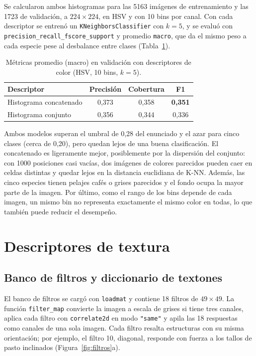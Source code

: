 \documentclass[11pt]{article}
\begin{document}
Se calcularon ambos histogramas para las 5163 imágenes de entrenamiento y las 1723 de validación, a $224\times224$, en HSV y con 10 bins por canal. Con cada descriptor se entrenó un \texttt{KNeighborsClassifier} con $k=5$, y se evaluó con \texttt{precision\_recall\_fscore\_support} y promedio \texttt{macro}, que da el mismo peso a cada especie pese al desbalance entre clases (Tabla~\ref{tab:color}).

\begin{table}[H]
\centering
\caption{Métricas promedio (macro) en validación con descriptores de color (HSV, 10 bins, $k=5$).}
\label{tab:color}
\begin{tabular}{lccc}
\toprule
Descriptor & Precisión & Cobertura & F1 \\
\midrule
Histograma concatenado & 0,373 & 0,358 & \textbf{0,351} \\
Histograma conjunto    & 0,356 & 0,344 & 0,336 \\
\bottomrule
\end{tabular}
\end{table}

Ambos modelos superan el umbral de 0,28 del enunciado y el azar para cinco clases (cerca de 0,20), pero quedan lejos de una buena clasificación. El concatenado es ligeramente mejor, posiblemente por la dispersión del conjunto: con 1000 posiciones casi vacías, dos imágenes de colores parecidos pueden caer en celdas distintas y quedar lejos en la distancia euclidiana de K-NN. Además, las cinco especies tienen pelajes cafés o grises parecidos y el fondo ocupa la mayor parte de la imagen. Por último, como el rango de los bins depende de cada imagen, un mismo bin no representa exactamente el mismo color en todas, lo que también puede reducir el desempeño.

\section{Descriptores de textura}

\subsection{Banco de filtros y diccionario de textones}

El banco de filtros se cargó con \texttt{loadmat} y contiene 18 filtros de $49\times49$. La función \texttt{filter\_map} convierte la imagen a escala de grises si tiene tres canales, aplica cada filtro con \texttt{correlate2d} en modo \texttt{"same"} y apila las 18 respuestas como canales de una sola imagen. Cada filtro resalta estructuras con su misma orientación; por ejemplo, el filtro 10, diagonal, responde con fuerza a los tallos de pasto inclinados (Figura~\ref{fig:filtros}a).
\end{document}
